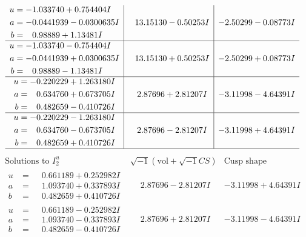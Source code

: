 \documentclass[1p]{elsarticle_modified}
\theoremstyle{definition}
\newcommand{\I}{\sqrt{-1}}
\begin{document}
$$\begin{array}{c|c|c}
\begin{aligned}
u &= -1.033740 + 0.754404 I \\
a &= -0.0441939 - 0.0300635 I \\
b &= \phantom{-}0.98889 + 1.13481 I\end{aligned}
 & \phantom{-}13.15130 - 0.50253 I & -2.50299 - 0.08773 I \\ \hline\begin{aligned}
u &= -1.033740 - 0.754404 I \\
a &= -0.0441939 + 0.0300635 I \\
b &= \phantom{-}0.98889 - 1.13481 I\end{aligned}
 & \phantom{-}13.15130 + 0.50253 I & -2.50299 + 0.08773 I \\ \hline\begin{aligned}
u &= -0.220229 + 1.263180 I \\
a &= \phantom{-}0.634760 + 0.673705 I \\
b &= \phantom{-}0.482659 - 0.410726 I\end{aligned}
 & \phantom{-}2.87696 + 2.81207 I & -3.11998 - 4.64391 I \\ \hline\begin{aligned}
u &= -0.220229 - 1.263180 I \\
a &= \phantom{-}0.634760 - 0.673705 I \\
b &= \phantom{-}0.482659 + 0.410726 I\end{aligned}
 & \phantom{-}2.87696 - 2.81207 I & -3.11998 + 4.64391 I\\
 \hline 
 \end{array}$$\newpage$$\begin{array}{c|c|c}  
\text{Solutions to }I^u_{2}& \I (\text{vol} + \sqrt{-1}CS) & \text{Cusp shape}\\
 \hline 
\begin{aligned}
u &= \phantom{-}0.661189 + 0.252982 I \\
a &= \phantom{-}1.093740 + 0.337893 I \\
b &= \phantom{-}0.482659 + 0.410726 I\end{aligned}
 & \phantom{-}2.87696 - 2.81207 I & -3.11998 + 4.64391 I \\ \hline\begin{aligned}
u &= \phantom{-}0.661189 - 0.252982 I \\
a &= \phantom{-}1.093740 - 0.337893 I \\
b &= \phantom{-}0.482659 - 0.410726 I\end{aligned}
 & \phantom{-}2.87696 + 2.81207 I & -3.11998 - 4.64391 I \\ \hline\begin{aligned}

\end{aligned}
\end{array}$$
\end{document}
